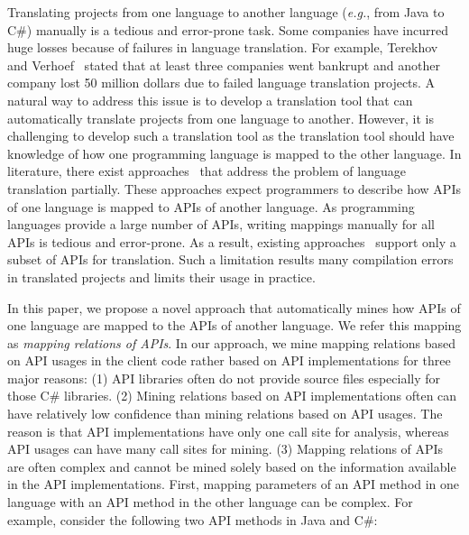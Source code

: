 Translating projects from one language to another language
(\emph{e.g.}, from Java to C\#) manually is a tedious and
error-prone task. Some companies have incurred huge losses because
of failures in language translation. For example, Terekhov and
Verhoef~\cite{terekhov2000realities} stated that at least three
companies went bankrupt and another company lost 50 million dollars
due to failed language translation projects. A natural way to
address this issue is to develop a translation tool that can
automatically translate projects from one language to another.
However, it is challenging to develop such a translation tool as the
translation tool should have knowledge of how one programming
language is mapped to the other language. In literature, there exist
approaches~\cite{mossienko2003automated, yasumatsu1995spice,
hainaut2008migration} that address the problem of language
translation partially. These approaches expect programmers to
describe how APIs of one language is mapped to APIs of another
language.  As programming languages provide a large number of APIs,
writing mappings manually for all APIs is tedious and error-prone.
As a result, existing
approaches~\cite{mossienko2003automated,yasumatsu1995spice,hainaut2008migration}
support only a subset of APIs for translation. Such a limitation
results many compilation errors in translated projects and limits
their usage in practice.

In this paper, we propose a novel approach that automatically mines how APIs of
one language are mapped to the APIs of another language. We refer
this mapping as \emph{mapping relations of APIs}. In our approach,
we mine mapping relations based on API usages in the client
code rather based on API implementations for three major reasons:
(1) API libraries often do not provide source files especially for
those C\# libraries. (2) Mining relations based on API
implementations often can have relatively low confidence than mining
relations based on API usages. The reason is that API
implementations have only one call site for analysis, whereas
API usages can have many call sites for mining. (3) Mapping
relations of APIs are often complex and cannot be mined solely based
on the information available in the API implementations. First,
mapping parameters of an API method in one language with an API
method in the other language can be complex. For example, consider
the following two API methods in Java and C\#:

